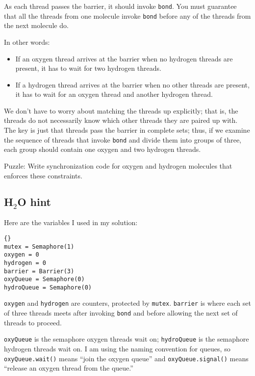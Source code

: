 \documentclass{book}
\newcommand{\clearemptydoublepage}{\newpage\cleardoublepage}
\begin{document}
As each thread passes the barrier, it should invoke
{\tt bond}.  You must guarantee that all the threads
from one molecule invoke {\tt bond} before any of the threads
from the next molecule do.

In other words:

\begin{itemize}

\item If an oxygen thread arrives at the barrier when no
hydrogen threads are present, it has to wait for two
hydrogen threads.

\item If a hydrogen thread arrives at the barrier when
no other threads are present, it has to wait for an
oxygen thread and another hydrogen thread.

\end{itemize}

We don't have to worry about matching the threads up explicitly; that
is, the threads do not necessarily know which other threads they are
paired up with.  The key is just that threads pass the barrier in
complete sets; thus, if we examine the sequence of threads that invoke
{\tt bond} and divide them into groups of three, each group should
contain one oxygen and two hydrogen threads.

Puzzle: Write synchronization code for oxygen and hydrogen
molecules that enforces these constraints.


\clearemptydoublepage
\subsection {H$_2$O hint}

Here are the variables I used in my solution:

\begin{lstlisting}[title={Water building hint}]{}
mutex = Semaphore(1)
oxygen = 0
hydrogen = 0
barrier = Barrier(3)
oxyQueue = Semaphore(0)
hydroQueue = Semaphore(0)
\end{lstlisting}

{\tt oxygen} and {\tt hydrogen} are counters, protected by {\tt mutex}.
{\tt barrier} is where each set of three threads meets after
invoking {\tt bond} and before allowing the next set of threads
to proceed.

{\tt oxyQueue} is the semaphore oxygen threads wait on;
{\tt hydroQueue} is the semaphore hydrogen threads wait on.
I am using the naming convention for queues, so
{\tt oxyQueue.wait()} means ``join the oxygen queue'' and
{\tt oxyQueue.signal()} means ``release an oxygen thread from
the queue.''
\end{document}
